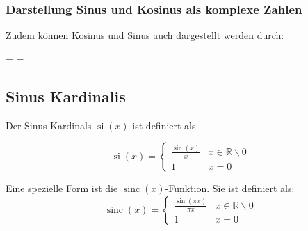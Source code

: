 \documentclass[12pt, a4paper]{scrartcl}
\begin{document}
\subsubsection{Darstellung Sinus und Kosinus als komplexe Zahlen}

Zudem können Kosinus und Sinus auch dargestellt werden durch:

\begin{mathframed}
  \cos \varphi =  \qquad
  \sin \varphi = 
\end{mathframed}

\subsection{Sinus Kardinalis}

\begin{minipage}{.5\linewidth}
Der Sinus Kardinals \(\operatorname{si}(x)\) ist definiert als

\[
  \operatorname{si}(x)=
  \begin{cases}
    \frac{\sin(x)}{x} & x \in \mathbb{R} \backslash 0\\
    1 & x = 0
  \end{cases}
\]
\end{minipage}%
\begin{minipage}{.5\linewidth}
  \begin{center}
  \end{center}
\end{minipage}

\begin{minipage}{.5\linewidth}
  Eine spezielle Form ist die \(\operatorname{sinc}(x)\)-Funktion. Sie ist definiert als:
  \[
    \operatorname{sinc}(x)=
    \begin{cases}
      \frac{\sin(\pi x)}{\pi x} & x \in\mathbb{R} \backslash 0\\
      1 & x = 0
    \end{cases}
  \]
\end{minipage}%
\begin{minipage}{.5\linewidth}
  \begin{center}
  \end{center}
\end{minipage}
\end{document}
